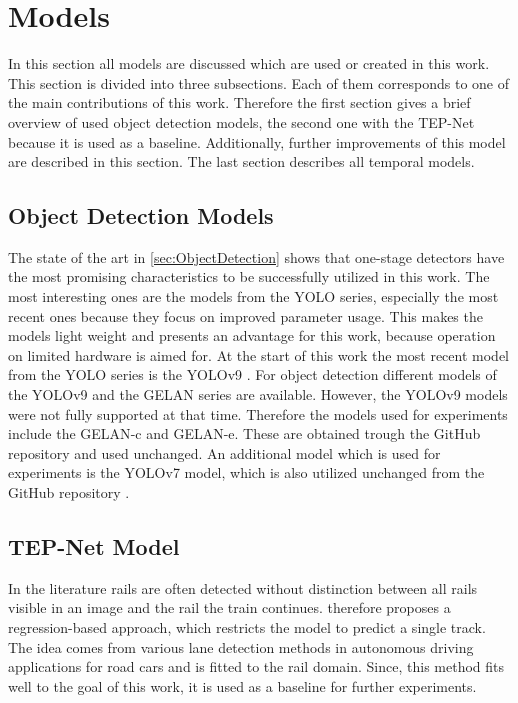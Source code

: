 \section{Models}

In this section all models are discussed which are used or created in this work.
This section is divided into three subsections.
Each of them corresponds to one of the main contributions of this work.
Therefore the first section gives a brief overview of used object detection models, the second one with the \ac{TEP}-Net \cite{tepNet2024} because it is used as a baseline.
Additionally, further improvements of this model are described in this section.
The last section describes all temporal models.

\subsection{Object Detection Models}

The state of the art in \autoref{sec:ObjectDetection} shows that one-stage detectors have the most promising characteristics to be successfully utilized in this work.
The most interesting ones are the models from the \ac{YOLO} series, especially the most recent ones because they focus on improved parameter usage.
This makes the models light weight and presents an advantage for this work, because operation on limited hardware is aimed for.
At the start of this work the most recent model from the \ac{YOLO} series is the \ac{YOLO}v9 \cite{YOLOv9}.
For object detection different models of the \ac{YOLO}v9 and the \ac{GELAN} series are available.
However, the \ac{YOLO}v9 models were not fully supported at that time.
Therefore the models used for experiments include the \ac{GELAN}-c and \ac{GELAN}-e.
These are obtained trough the GitHub repository \cite{YOLOv9GitHub} and used unchanged.
An additional model which is used for experiments is the \ac{YOLO}v7 \cite{yolov7} model, which is also utilized unchanged from the GitHub repository \cite{YOLOv7GitHub}.

\subsection{TEP-Net Model}
\label{subsec:baselineModel}

In the literature rails are often detected without distinction between all rails visible in an image and the rail the train continues.
\cite{tepNet2024} therefore proposes a regression-based approach, which restricts the model to predict a single track.
The idea comes from various lane detection methods in autonomous driving applications for road cars and is fitted to the rail domain.
Since, this method fits well to the goal of this work, it is used as a baseline for further experiments.

